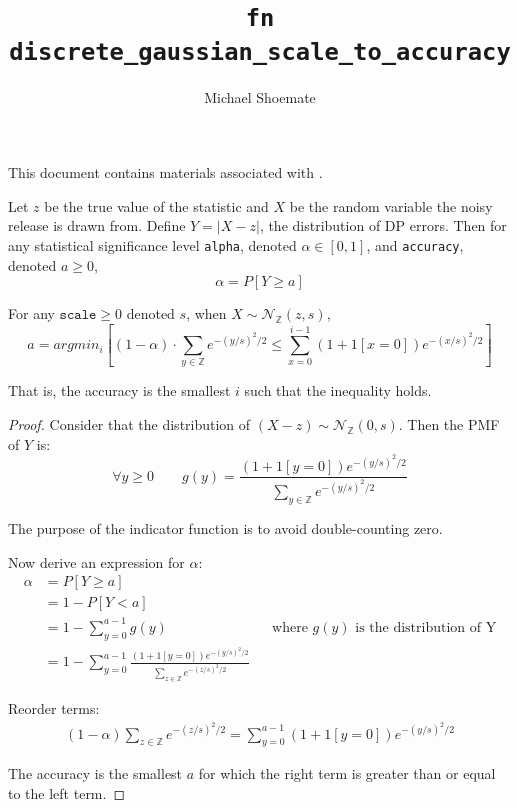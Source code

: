 \documentclass{article}
\title{\texttt{fn discrete\_gaussian\_scale\_to\_accuracy}}
\author{Michael Shoemate}
\begin{document}
\maketitle

This document contains materials associated with .

\begin{definition}
    Let $z$ be the true value of the statistic and $X$ be the random variable the noisy release is drawn from.
    Define $Y = |X - z|$, the distribution of DP errors. 
    Then for any statistical significance level \texttt{alpha}, denoted $\alpha \in [0, 1]$, and \texttt{accuracy}, denoted $a \ge 0$,
    \begin{equation}
        \alpha = P[Y \ge a]
    \end{equation}
\end{definition}

\begin{theorem}
    For any $\texttt{scale} \ge 0$ denoted $s$, when $X \sim \mathcal{N}_\mathbb{Z}(z, s)$, 
    \begin{equation}
        a = argmin_i \left[(1 - \alpha) \cdot \sum_{y\in \mathbb{Z}} e^{-(y/s)^2/2} 
        \le \sum_{x=0}^{i - 1} (1 + 1[x=0]) e^{-(x/s)^2/2} \right]
    \end{equation}

    That is, the accuracy is the smallest $i$ such that the inequality holds.
\end{theorem}

\begin{proof}

Consider that the distribution of $(X - z) \sim \mathcal{N}_\mathbb{Z}(0, s)$.
Then the PMF of $Y$ is:
\begin{equation}
    \forall y \ge 0 \qquad g(y) = \frac{(1 + 1[y = 0]) e^{-(y/s)^2/2}}{\sum_{y \in \mathbb{Z}} e^{-(y/s)^2/2} }
\end{equation}

The purpose of the indicator function is to avoid double-counting zero.

Now derive an expression for $\alpha$:
\begin{align*}
    \alpha &= P[Y \ge a] \\
    &= 1 - P[Y < a] \\
    &= 1 - \sum_{y=0}^{a - 1} g(y) && \text{where $g(y)$ is the distribution of Y} \\
    &= 1 - \sum_{y=0}^{a - 1} \frac{(1 + 1[y = 0]) e^{-(y/s)^2/2}}{\sum_{z \in \mathbb{Z}} e^{-(z/s)^2/2} }
\end{align*}

Reorder terms:
\begin{align*}
    (1 - \alpha) \sum_{z \in \mathbb{Z}} e^{-(z/s)^2/2} = \sum_{y=0}^{a - 1} (1 + 1[y = 0]) e^{-(y/s)^2/2}
\end{align*}

The accuracy is the smallest $a$ for which the right term is greater than or equal to the left term.
\end{proof}
\end{document}

